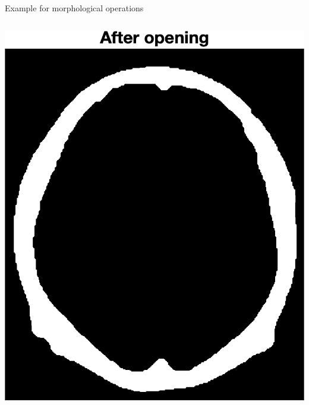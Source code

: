 \begin{frame}{Example for morphological operations}
\begin{columns}[onlytextwidth,T]
\begin{column}{0.30\textwidth}
            \includegraphics[height=0.60\textheight]{images/brain_t200_2_opened.png}
         \end{column}
     \end{columns}
\end{frame}



